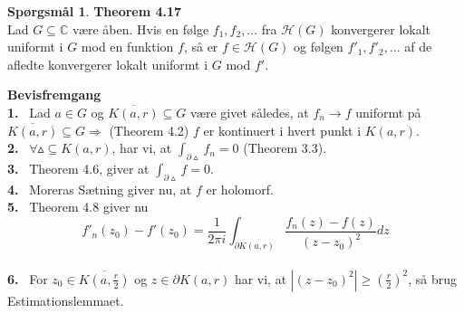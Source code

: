 \documentclass[10pt,a4paper]{article}
\theoremstyle{definition}
\newtheorem{Prob}{Spørgsmål}
\begin{document}
\newpage
\begin{Prob}{\textbf{Theorem 4.17}} \\

Lad $G \subseteq \mathbb{C}$ være åben. Hvis en følge $f_1,f_2,...$ fra $\mathcal{H}(G)$ konvergerer lokalt uniformt i $G$ mod en funktion $f$, så er $f \in \mathcal{H}(G)$ og følgen $f'_1,f'_2,...$ af de afledte konvergerer lokalt uniformt i $G$ mod $f'$.
\end{Prob}

\begin{framed}
\textbf{Bevisfremgang} \\
\textbf{1.} \ Lad $a \in G$ og $\overline{K(a,r)} \subseteq G$ være givet således, at $f_n \rightarrow f$ uniformt på $\overline{K(a,r)} \subseteq G \Rightarrow$ (Theorem 4.2) $f$ er kontinuert i hvert punkt i $K(a,r)$. \\
\textbf{2.} \ $\forall\vartriangle \subseteq K(a,r)$, har vi, at $\int_{\partial \vartriangle} f_n = 0$ (Theorem 3.3).  \\
\textbf{3.} \ Theorem 4.6, giver at $\int_{\partial  \vartriangle} f = 0.$ \\
\textbf{4.} \ Moreras Sætning giver nu, at $f$ er holomorf.\\
\textbf{5.} \ Theorem 4.8 giver nu 
$$f'_n(z_0)-f'(z_0) = \frac{1}{2 \pi i} \int_{\partial K(a,r)} \frac{f_n(z)-f(z)}{(z-z_0)^2}dz$$\\
\textbf{6.} \ For $z_0 \in \overline{K(a,\frac{r}{2})}$ og $z \in \partial K(a,r)$ har vi, at $|(z-z_0)^2| \geq (\frac{r}{2})^2$, så brug Estimationslemmaet. \\
\end{framed}
\end{document}
